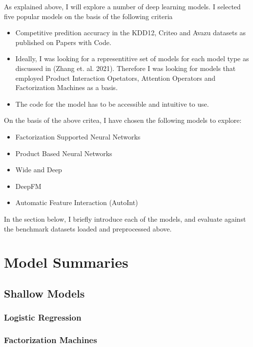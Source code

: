 \documentclass{mldsmsc}
\begin{document}
As explained above, I will explore a number of deep learning models. I selected five popular models on the basis of the following criteria

\begin{itemize}
\item Competitive predition accuracy in the KDD12, Criteo and Avazu datasets as published on Papers with Code.
\item Ideally, I was looking for a representitive set of models for each model type as discussed in (Zhang et. al. 2021). Therefore I was looking for models that employed Product Interaction Opetators, Attention Operators and Factorization Machines as a basis.
\item The code for the model has to be accessible and intuitive to use.
\end{itemize}

On the basis of the above critea, I have chosen the following models to explore:

\begin{itemize}
\item Factorization Supported Neural Networks
\item Product Based Neural Networks
\item Wide and Deep
\item DeepFM
\item Automatic Feature Interaction (AutoInt)
\end{itemize}

In the section below, I briefly introduce each of the models, and evaluate against the benchmark datasets loaded and preprocessed above.

\section{Model Summaries}

\subsection{Shallow Models}

\subsubsection{Logistic Regression}


\subsubsection{Factorization Machines}
\end{document}
